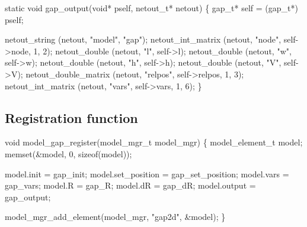 \nwendcode{}\nwdocspar

\nwenddocs{}\plusendmoddef
static void gap_output(void* pself, netout_t* netout)
\{
    gap_t* self = (gap_t*) pself;

    netout_string        (netout, "model",  "gap");
    netout_int_matrix    (netout, "node",   self->node,   1, 2);
    netout_double        (netout, "l",      self->l);
    netout_double        (netout, "w",      self->w);
    netout_double        (netout, "h",      self->h);
    netout_double        (netout, "V",      self->V);
    netout_double_matrix (netout, "relpos", self->relpos, 1, 3);
    netout_int_matrix    (netout, "vars",   self->vars,   1, 6);
\}

\nwendcode{}\nwdocspar

\subsection{Registration function}

\nwenddocs{}\endmoddef
void model_gap_register(model_mgr_t model_mgr)
\{
    model_element_t model;
    memset(&model, 0, sizeof(model));

    model.init         = gap_init;
    model.set_position = gap_set_position;
    model.vars         = gap_vars;
    model.R            = gap_R;
    model.dR           = gap_dR;
    model.output       = gap_output;

    model_mgr_add_element(model_mgr, "gap2d", &model);
\}

\nwendcode{}

%
%
%
%
%
%
%
\nwdocspar
\nwenddocs{}
